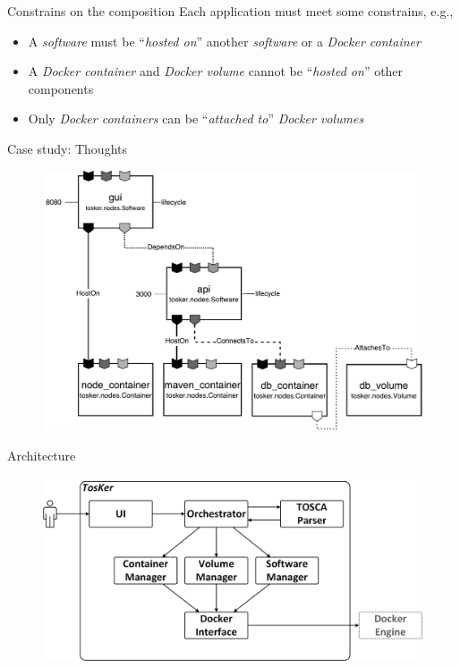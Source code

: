 \documentclass{beamer}
\begin{document}
  \begin{frame}{Constrains on the composition}
    Each application must meet some constrains, e.g.,
    \begin{itemize}
      \item \small A \emph{software} must be ``\emph{hosted on}'' another \emph{software} or a \emph{Docker container}
      \item \small A \emph{Docker container} and \emph{Docker volume} cannot be ``\emph{hosted on}'' other components
      \item \small Only \emph{Docker containers} can be ``\emph{attached to}'' \emph{Docker volumes}
    \end{itemize}
  \end{frame}

  \begin{frame}{Case study: Thoughts}
    \begin{figure}
      \includegraphics[width=\textwidth]{img/thoughts_architecture.pdf}
    \end{figure}
  \end{frame}

  \begin{frame}{Architecture}
    \begin{figure}
      \includegraphics[width=\textwidth]{img/architecture.png}
    \end{figure}
  \end{frame}
\end{document}
